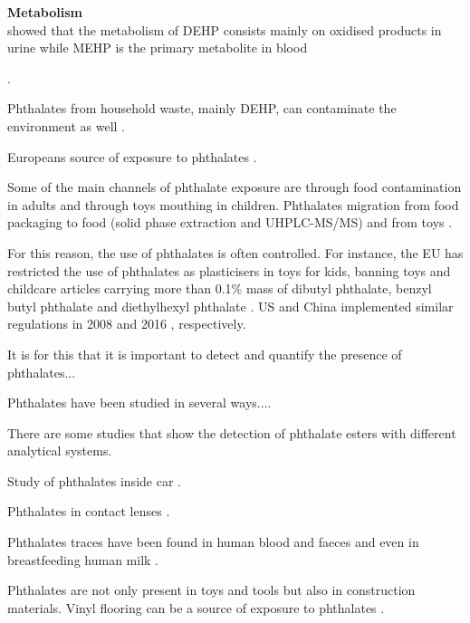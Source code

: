 \textbf{Metabolism}\\
\citeauthor{wittassek2008phthalates} showed that the metabolism of DEHP consists mainly on oxidised products in urine while MEHP is the primary metabolite in blood 

\cite{wittassek2008phthalates}.

















Phthalates from household waste, mainly DEHP, can contaminate the environment as well \cite{bauer1997estimation}.




Europeans source of exposure to phthalates \cite{wormuth2006sources}.




Some of the main channels of phthalate exposure are through food contamination in adults and through toys mouthing in children. Phthalates migration from food packaging to food (solid phase extraction and UHPLC-MS/MS)  \cite{fan2012determination} and from toys \cite{earls2003gas}.

For this reason, the use of phthalates is often controlled. For instance, the EU has restricted the use of phthalates as plasticisers in toys for kids, banning toys and childcare articles carrying more than  0.1\% mass of dibutyl phthalate, benzyl butyl phthalate  and diethylhexyl  phthalate  \cite{Parliament2005}. US and China  implemented similar regulations in 2008 \cite{USban} and 2016 \cite{chinaGB6675}, respectively. 


It is for this that it is important to detect and quantify the presence of phthalates...

Phthalates have been studied in several ways....

There are some studies that show the detection of phthalate esters with different analytical systems.


Study of phthalates inside car \cite{geiss2009investigation}.

Phthalates in contact lenses \cite{perez2011presence}.

Phthalates traces have been found in human blood and faeces \cite{de2014review} and even in breastfeeding human milk \cite{zhu2006phthalate}.

Phthalates are not only present in toys and tools but also in construction materials. Vinyl flooring can be a source of exposure to phthalates \cite{gong2018letter}.

